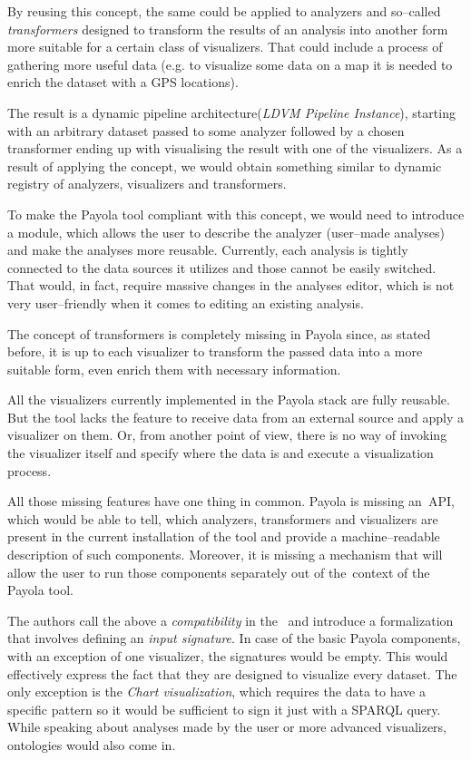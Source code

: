 By reusing this concept, the same could be applied to analyzers and so--called 
\emph{transformers} designed to transform the results of an analysis 
into another form more suitable for a certain class of visualizers. 
That could include a process of gathering more useful data (e.g. to visualize 
some data on a map it is needed to enrich the dataset with a GPS locations).

The result is a dynamic pipeline architecture(\emph{LDVM Pipeline Instance}),
starting with an arbitrary 
dataset passed to some analyzer followed by a chosen transformer ending up with
visualising the result with one of the visualizers. As a result of applying the concept,
we would obtain something similar to dynamic 
registry of analyzers, visualizers and transformers.

To make the Payola tool 
compliant with this concept, we would need to introduce a module, which allows the user
to describe the analyzer (user--made analyses) and make the 
analyses more reusable. Currently, each analysis is tightly connected to the 
data sources it utilizes and those cannot be easily switched. That would, in 
fact, require massive changes in the analyses editor, which is not very 
user--friendly when it comes to editing an existing analysis.

The concept of transformers is completely missing in Payola since, as stated 
before, it is up to each visualizer to transform the passed data into a more 
suitable form, even enrich them with necessary information.

All the visualizers currently implemented in the Payola stack are fully 
reusable. But the tool lacks the feature to receive data from an external source 
and apply a visualizer on them. Or, from another point of view, there is no 
way of invoking the visualizer itself and specify where the data is and execute a 
visualization process.

All those missing features have one thing in common. Payola is missing 
an~API, which would be able to tell, which analyzers, transformers and 
visualizers are present in the current installation of the tool and provide a 
machine--readable description of such components. Moreover, it is missing a 
mechanism that will allow the user to run those components separately out of 
the~context of the Payola tool.

The authors call the above a \emph{compatibility} in the~\cite{ldvm2} and 
introduce a formalization that involves defining an \emph{input signature}.
In case of the basic Payola components, with an exception of one visualizer, the signatures
would be empty. This would effectively express the fact that they are designed to
visualize every dataset. The only exception is the \emph{Chart visualization},
which requires the data to have a specific pattern so it would be sufficient to sign it 
just with a SPARQL query. While speaking about analyses made by the user or more 
advanced visualizers, ontologies would also come in.

